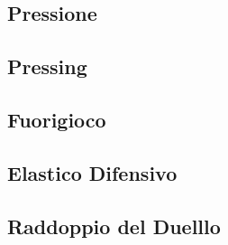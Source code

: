\documentclass[../uefaC.tex]{subfiles}
\begin{document}
\subsection{Pressione}

\subsection{Pressing}

\subsection{Fuorigioco}

\subsection{Elastico Difensivo}

\subsection{Raddoppio del Duelllo}
\end{document}
